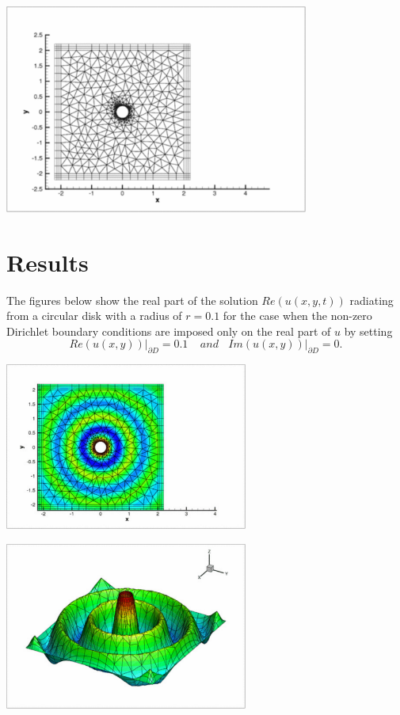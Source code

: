  
\begin{DoxyImage}
\includegraphics[width=0.75\textwidth]{Mesh}
\end{DoxyImage}
\hypertarget{index_results}{}\section{Results}\label{index_results}
The figures below show the real part of the solution $ Re(u(x,y,t)) $ radiating from a circular disk with a radius of $ r=0.1 $ for the case when the non-\/zero Dirichlet boundary conditions are imposed only on the real part of $ u $ by setting \[ Re(u(x,y))\bigg|_{\partial D} = 0.1 \ \ \ \ \ and \ \ \ \ Im(u(x,y))\bigg|_{\partial D} = 0. \]

 
\begin{DoxyImage}
\includegraphics[width=0.6\textwidth]{Soln2D}
\end{DoxyImage}


 
\begin{DoxyImage}
\includegraphics[width=0.6\textwidth]{SolnHeight}
\end{DoxyImage}


